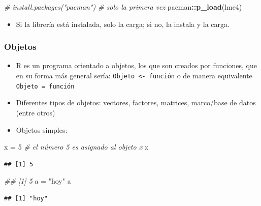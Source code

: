 \documentclass[]{article}
\newenvironment{Shaded}{\begin{snugshade}}{\end{snugshade}}
\newcommand{\CommentTok}[1]{\textcolor[rgb]{0.56,0.35,0.01}{\textit{#1}}}
\newcommand{\DecValTok}[1]{\textcolor[rgb]{0.00,0.00,0.81}{#1}}
\newcommand{\KeywordTok}[1]{\textcolor[rgb]{0.13,0.29,0.53}{\textbf{#1}}}
\newcommand{\NormalTok}[1]{#1}
\newcommand{\OperatorTok}[1]{\textcolor[rgb]{0.81,0.36,0.00}{\textbf{#1}}}
\newcommand{\StringTok}[1]{\textcolor[rgb]{0.31,0.60,0.02}{#1}}
\providecommand{\tightlist}{%
  \setlength{\itemsep}{0pt}\setlength{\parskip}{0pt}}
\begin{document}
\begin{Shaded}
\begin{Highlighting}[]
\CommentTok{# install.packages("pacman") # solo la primera vez}
\NormalTok{pacman}\OperatorTok{::}\KeywordTok{p_load}\NormalTok{(lme4)}
\end{Highlighting}
\end{Shaded}

\begin{itemize}
\tightlist
\item
  Si la librería está instalada, solo la carga; si no, la instala y la
  carga.
\end{itemize}

\hypertarget{objetos}{%
\subsubsection{Objetos}\label{objetos}}

\begin{itemize}
\item
  R es un programa orientado a objetos, los que son creados por
  funciones, que en su forma más general sería:
  \texttt{Objeto\ \textless{}-\ función} o de manera equivalente
  \texttt{Objeto\ =\ función}
\item
  Diferentes tipos de objetos: vectores, factores, matrices, marco/base
  de datos (entre otros)
\item
  Objetos simples:
\end{itemize}

\begin{Shaded}
\begin{Highlighting}[]
\NormalTok{x =}\StringTok{ }\DecValTok{5} \CommentTok{# el número 5 es asignado al objeto x}
\NormalTok{x}
\end{Highlighting}
\end{Shaded}

\begin{verbatim}
## [1] 5
\end{verbatim}

\begin{Shaded}
\begin{Highlighting}[]
\CommentTok{## [1] 5}
\NormalTok{a =}\StringTok{ "hoy"}
\NormalTok{a}
\end{Highlighting}
\end{Shaded}

\begin{verbatim}
## [1] "hoy"
\end{verbatim}
\end{document}
